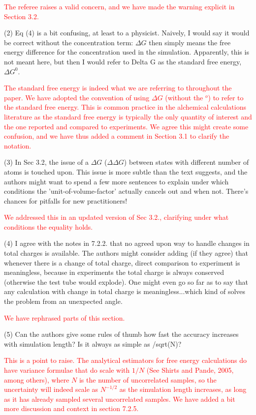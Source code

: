 \documentclass[11pt,a4paper]{letter} %
\begin{document}
\begin{letter}
\textcolor{red}{The referee raises a valid concern, and we have made the warning explicit in Section 3.2.}

(2) Eq (4) is a bit confusing, at least to a physicist. Naively, I would say it would be correct without the concentration term: $\Delta G$ then simply means the free energy difference for the concentration used in the simulation. Apparently, this is not meant here, but then I would refer to Delta G as the standard free energy, $\Delta G^0$.

\textcolor{red}{The standard free energy is indeed what we are referring to throughout the paper. We have adopted the convention of using $\Delta G$ (without the $^o$) to refer to the standard free energy. This is common practice in the alchemical calculations literature as the standard free energy is typically the only quantity of interest and the one reported and compared to experiments. We agree this might create some confusion, and we have thus added a comment in Section 3.1 to clarify the notation.}

(3) In Sec 3.2, the issue of a $\Delta G$ ($\Delta \Delta G$) between states with different number of atoms is touched upon. This issue is more subtle than the text suggests, and the authors might want to spend a few more sentences to explain under which conditions the 'unit-of-volume-factor' actually cancels out and when not. There's chances for pitfalls for new practitioners!

\textcolor{red}{We addressed this in an updated version of Sec 3.2., clarifying under what conditions the equality holds.}


(4) I agree with the notes in 7.2.2. that no agreed upon way to handle changes in total charges is available. The authors might consider adding (if they agree) that whenever there is a change of total charge, direct comparison to experiment is meaningless, because in experiments the total charge is always conserved (otherwise the test tube would explode). One might even go so far as to say that any calculation with change in total charge is meaningless...which kind of solves the problem from an unexpected angle.

\textcolor{red}{We have rephrased parts of this section. }

(5) Can the authors give some rules of thumb how fast the accuracy increases with simulation length? Is it always as simple as /sqrt(N)?

\textcolor{red}{This is a point to raise. The analytical estimators for free energy calculations do have variance formulae that do scale with $1/N$ (See Shirts and Pande, 2005, among others), where $N$ is the number of uncorrelated samples, so the uncertainty will indeed scale as $N^{-1/2}$ as the simulation length increases, as long as it has already sampled several uncorrelated samples. We have added a bit more discussion and context in section 7.2.5.}


\end{letter}
\end{document}
